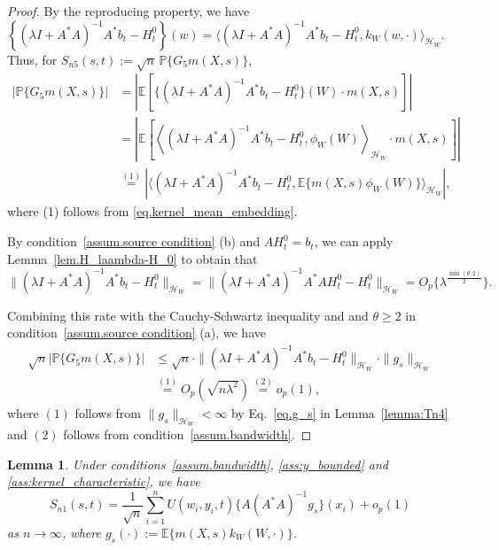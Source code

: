 \documentclass[
  12pt]{article}
\newtheorem{lemma}{Lemma}
\def\to{\rightarrow}
\def\mP{\mathbb{P}}
\begin{document}
\begin{proof}
By the reproducing property, we have $\left\{(\lambda I + A^*A)^{-1}A^*b_t-H^0_t \right\}(w)=\langle(\lambda I + A^*A)^{-1}A^*b_t-H^0_t,k_W(w,\cdot)\rangle_{\mathcal{H}_{W}}$. Thus, for $S_{n5}(s,t):=\sqrt{n}\,\mP\{G_5m(X,s)\}$,
\begin{align*}
	\left| \mathbb{P} \{G_5m(X,s)\} \right|&=\left| \mathbb{E} \left[ \{(\lambda I+A^*A)^{-1}A^*b_t-H^0_t\}(W)\cdot m(X,s) \right] \right|\\
	&=\left| \mathbb{E} \left[ \left< (\lambda I+A^*A)^{-1}A^*b_t-H^0_t,\phi_W\left( W \right) \right>_{\mathcal{H}_W}\cdot m(X,s) \right] \right|\\
	&\overset{(1)}{=}\left| \langle (\lambda I+A^*A)^{-1}A^*b_t-H^0_t,\mathbb{E} \{m(X,s)\phi_W(W)\}\rangle_{\mathcal{H}_W} \right|,
\end{align*}
where (1) follows from \eqref{eq.kernel_mean_embedding}.

By condition~\ref{assum.source condition} (b) and $AH^0_t =b_t$, we can apply Lemma~\ref{lem.H_laambda-H_0} to obtain that 
$$\|(\lambda I + A^*A)^{-1}A^*b_t-H^0_t\|_{\mathcal{H}_W}=\|(\lambda I + A^*A)^{-1}A^*AH^0_t-H^0_t\|_{\mathcal{H}_W}=O_p\{\lambda^{\frac{\min(\theta ,2)}{2}}\}.
$$


Combining this rate with the Cauchy-Schwartz inequality and and $\theta \geq 2$ in condition~\ref{assum.source condition} (a), we have 
\begin{equation}\label{eq: inner product of Regularization Bias }
\begin{aligned}
	\sqrt{n}\left| \mathbb{P} \{ G_5m(X,s) \} \right|&\le \sqrt{n}\cdot \| (\lambda I+A^*A)^{-1}A^*b_t-H^0_t\|_{\mathcal{H}_W} \cdot \| g_s\|_{\mathcal{H}_W} \\
    &\overset{(1)}{=}O_{p}(\sqrt{n\lambda^2})\overset{(2)}{=}o_{p}(1),
\end{aligned}
\end{equation}
where $(1)$ follows from $ \| g_s\|_{\mathcal{H}_W}<\infty$ by Eq.~\eqref{eq.g_s} in Lemma~\ref{lemma:Tn4} and $(2)$ follows from condition~\ref{assum.bandwidth}.
\end{proof}

\begin{lemma}
\label{lemma:Tn1}
Under conditions~\ref{assum.bandwidth}, \ref{ass:y_bounded} and \ref{ass:kernel_characteristic}, we have 
$$
S_{n1}(s,t)=\frac{1}{\sqrt{n}}\sum_{i=1}^n{U(w_i,y_i,t) \{A(A^*A)^{-1}g_s\}(x_i)}+o_{p}(1)
$$ 
as $n\to\infty$, where
$g_s(\cdot):=\mathbb{E}\{m(X,s) k_W( W,\cdot )\}$.
\end{lemma}
\end{document}
